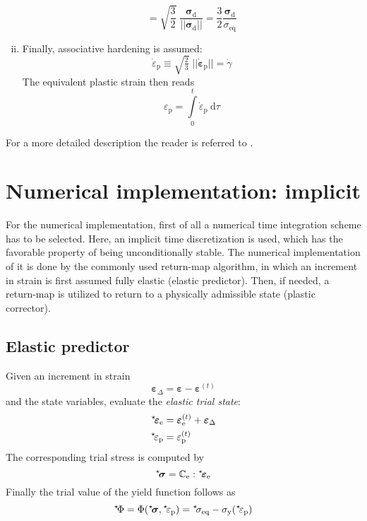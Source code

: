 \documentclass[times]{goose-article}
\newcommand\leftstar[1]{\hspace*{-.3em}~^\star\!#1}
\begin{document}
\begin{enumerate}[(i)]
\begin{equation}
  = \sqrt{\frac{3}{2}} \;
    \frac{\bm{\sigma}_\mathrm{d}}{|| \bm{\sigma}_\mathrm{d} ||}
  = \frac{3}{2}
    \frac{\bm{\sigma}_\mathrm{d}}{\sigma_\mathrm{eq}}
\end{equation}
\item Finally, associative hardening is assumed:
\begin{equation}
  \dot{\varepsilon}_\mathrm{p}
  \equiv \sqrt{\tfrac{2}{3}} \; \big|\big| \dot{\bm{\varepsilon}}_\mathrm{p} \big|\big|
  = \dot{\gamma}
\end{equation}
The equivalent plastic strain then reads
\begin{equation}
  \varepsilon_\mathrm{p} =
  \int\limits_0^t \dot{\varepsilon}_\mathrm{p} ~\mathrm{d}\tau
\end{equation}
\end{enumerate}
For a more detailed description the reader is referred to \citet[][p.\ 216-234]{DeSouzaNeto2008}.

\section{Numerical implementation: implicit}

For the numerical implementation, first of all a numerical time integration scheme has to be selected. Here, an implicit time discretization is used, which has the favorable property of being unconditionally stable. The numerical implementation of it is done by the commonly used return-map algorithm, in which an increment in strain is first assumed fully elastic (elastic predictor). Then, if needed, a return-map is utilized to return to a physically admissible state (plastic corrector).

\subsection{Elastic predictor}

Given an increment in strain
\begin{equation}
  \bm{\varepsilon}_\Delta
  = \bm{\varepsilon} - \bm{\varepsilon}^{(t)}
\end{equation}
and the state variables, evaluate the \emph{elastic trial state}:
\begin{align}
  \leftstar{\bm{\varepsilon}}_\mathrm{e}
  &= \bm{\varepsilon}_\mathrm{e}^{(t)} + \bm{\varepsilon}_\Delta
  \\
  \leftstar{\varepsilon}_\mathrm{p}
  &= \varepsilon_\mathrm{p}^{(t)}
\end{align}
The corresponding trial stress is computed by
\begin{equation}
  \leftstar{\bm{\sigma}}
  = \mathbb{C}_\mathrm{e} : \leftstar{\bm{\varepsilon}}_\mathrm{e}
\end{equation}
Finally the trial value of the yield function follows as
\begin{equation}
  \leftstar{\Phi}
  = \Phi( \leftstar{\bm{\sigma}} , \leftstar{\varepsilon}_\mathrm{p} )
  = \leftstar{\sigma}_\mathrm{eq}
  - \sigma_\mathrm{y} (\leftstar{\varepsilon}_\mathrm{p})
\end{equation}
\end{document}
